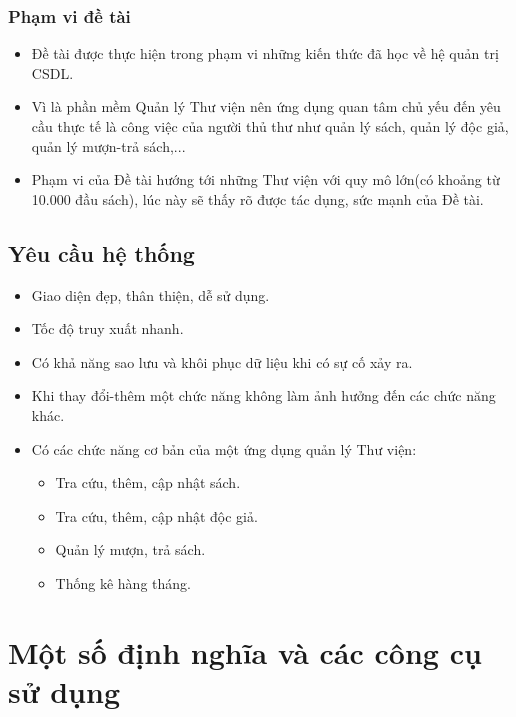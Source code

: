 \documentclass[12pt]{report}
\begin{document}
			\subsection{Phạm vi đề tài}
			\begin{itemize}
				\item{Đề tài được thực hiện trong phạm vi những kiến thức đã học về hệ quản trị CSDL.}
				\item{Vì là phần mềm Quản lý Thư viện nên ứng dụng quan tâm chủ yếu đến yêu cầu thực tế là công việc của người thủ thư như quản lý sách, quản lý độc giả, quản lý mượn-trả sách,...}
				\item{Phạm vi của Đề tài hướng tới những Thư viện với quy mô lớn(có khoảng từ 10.000 đầu sách), lúc này sẽ thấy rõ được tác dụng, sức mạnh của Đề tài.}
			\end{itemize}		
		\section{Yêu cầu hệ thống}
			\begin{itemize}
				\item{Giao diện đẹp, thân thiện, dễ sử dụng.}
				\item{Tốc độ truy xuất nhanh.}
				\item{Có khả năng sao lưu và khôi phục dữ liệu khi có sự cố xảy ra.}
				\item{Khi thay đổi-thêm một chức năng không làm ảnh hưởng đến các chức năng khác.}
				\item{Có các chức năng cơ bản của một ứng dụng quản lý Thư viện: }
					\begin{itemize}
						\item Tra cứu, thêm, cập nhật sách.
						\item Tra cứu, thêm, cập nhật độc giả.
						\item Quản lý mượn, trả sách.
						\item Thống kê hàng tháng.
					\end{itemize}
			\end{itemize}	
	\chapter{Một số định nghĩa và các công cụ sử dụng}
		\label{definition_chapter}				
\end{document}

